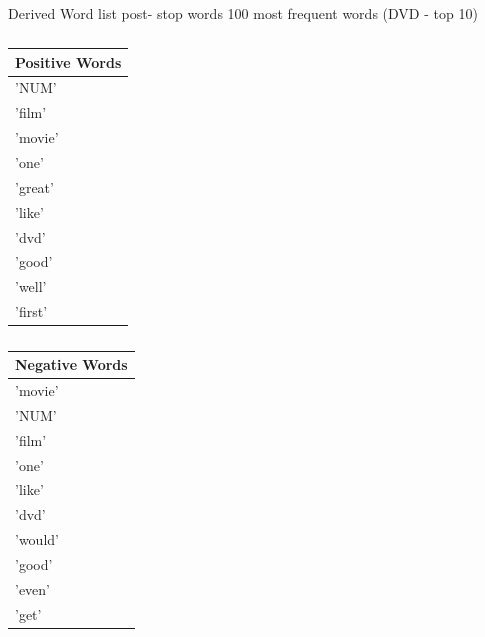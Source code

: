 \documentclass{llncs}
\begin{document}
\begin{center}
    \begin{table}
    \caption{Derived Word list post- stop words 100 most frequent words (DVD - top 10)}
    \begin{minipage}{.5\linewidth}
    \caption{}
    \centering
    \begin{tabular}{| l |}
        \hline
        Positive Words \\ \hline
        'NUM' \\ \hline
        'film' \\ \hline
        'movie' \\ \hline
        'one' \\ \hline
        'great' \\ \hline
        'like' \\ \hline
        'dvd' \\ \hline
        'good' \\ \hline
        'well' \\ \hline
        'first' \\ \hline
    \end{tabular}
    \end{minipage}%
    \begin{minipage}{.5\linewidth}
    \centering
    \caption{}
    \begin{tabular}{| l |}
        \hline
        Negative Words \\ \hline
        'movie' \\ \hline
        'NUM' \\ \hline
        'film' \\ \hline
        'one' \\ \hline
        'like' \\ \hline
        'dvd' \\ \hline
        'would' \\ \hline
        'good' \\ \hline
        'even' \\ \hline
        'get' \\ \hline
    \end{tabular}
    \end{minipage} 
    \end{table}
\end{center}
\end{document}
